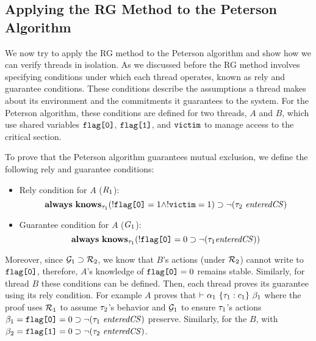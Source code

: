 \subsection{Applying the RG Method to the Peterson Algorithm}
We now try to apply the RG method to the Peterson algorithm and show how we can verify threads in isolation. As we discussed before the RG method involves specifying conditions under which each thread operates, known as rely and guarantee conditions. These conditions describe the assumptions a thread makes about its environment and the commitments it guarantees to the system. For the Peterson algorithm, these conditions are defined for two threads, $A$ and $B$, which use shared variables $\texttt{flag[0]}$, $\texttt{flag[1]}$, and $\texttt{victim}$ to manage access to the critical section.

To prove that the Peterson algorithm guarantees mutual exclusion, we define the following rely and guarantee conditions:
\begin{itemize}
    \item  Rely condition for $A$ (\(\textcolor{black}{ R_{1}}\)):
\[\mathbf{always}\ \mathbf{knows}_{\tau_1} (!\texttt{flag[0]} = 1 \wedge !\texttt{victim} = 1) \supset \neg(\tau_2\  \mathit{enteredCS})\]

    \item Guarantee condition for $A$ (\(\textcolor{black}{G_{1}}\)):
\[\mathbf{always}\ \mathbf{knows}_{\tau_1} (!\texttt{flag[0]} = 0 \supset \neg (\tau_1 \mathit{enteredCS}) )\]
\end{itemize}

Moreover, since $\mathcal{G}_1 \supset \mathcal{R}_2$, we know that $B$'s actions (under $\mathcal{R}_2$) cannot write to $\texttt{flag[0]}$, therefore, $A$'s knowledge of $\texttt{flag[0]} = 0$ remains stable.
Similarly, for thread $B$ these conditions can be defined.
%
%
Then, each thread proves its guarantee using its rely condition. For example $A$ proves that $\vdash \alpha_1\ \{\tid_1:c_1\}\  \beta_1$ where the proof uses $\mathcal{R}_1$ to assume $\tau_2$'s behavior and $\mathcal{G}_1$ to ensure $\tau_1$'s actions $\beta_1 = \FlagZero = 0 \Implies \neg(\tid_1\ \EntersCS)$ preserve. Similarly, for the $B$, with $\beta_2 = \texttt{flag[1]} = 0 \supset \neg(\tau_2\ \mathit{enteredCS})$.

